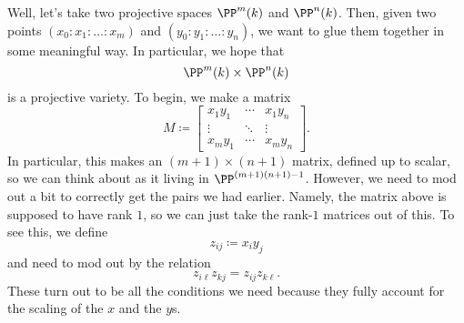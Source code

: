 Well, let's take two projective spaces $\PP^m(k)$ and $\PP^n(k)$. Then, given two points $(x_0:x_1:\ldots:x_m)$ and $(y_0:y_1:\ldots:y_n)$, we want to glue them together in some meaningful way. In particular, we hope that
\[\PP^m(k)\times\PP^n(k)\]
is a projective variety. To begin, we make a matrix
\[M\coloneqq\begin{bmatrix}
	x_1y_1 & \cdots & x_1y_n \\
	\vdots & \ddots & \vdots \\
	x_my_1 & \cdots & x_my_n
\end{bmatrix}.\]
In particular, this makes an $(m+1)\times(n+1)$ matrix, defined up to scalar, so we can think about as it living in $\PP^{(m+1)(n+1)-1}$. However, we need to mod out a bit to correctly get the pairs we had earlier. Namely, the matrix above is supposed to have rank $1$, so we can just take the rank-$1$ matrices out of this. To see this, we define
\[z_{ij}\coloneqq x_iy_j\]
and need to mod out by the relation
\[z_{i\ell}z_{kj}=z_{ij}z_{k\ell}.\]
These turn out to be all the conditions we need because they fully account for the scaling of the $x$ and the $y$s.

